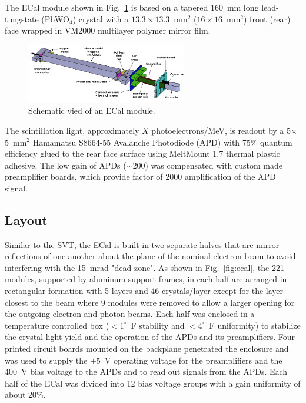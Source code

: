 \documentclass[final,3p,times,twocolumn]{elsarticle}
\begin{document}
The ECal module shown in Fig.~\ref{fig:ecal-module} is based on a tapered 160~mm long 
lead-tungstate (PbWO$_{4}$) crystal with a $13.3\times13.3$~mm$^2$ ($16\times16$~mm$^2$) front 
(rear) face wrapped in VM2000 multilayer polymer mirror film. 
\begin{figure}[]
\begin{center}
{\small
\includegraphics[width=7cm]{figures/ecal-module-schematic.png}
\caption{Schematic vied of an ECal module.}
\label{fig:ecal-module}
}
\end{center}
\end{figure}
The scintillation light, approximately $X$ photoelectrons/MeV, is readout by a 
5$\times$5~mm$^2$ Hamamatsu S8664-55 Avalanche Photodiode (APD) with 75\% quantum 
efficiency glued to the rear face surface using MeltMount 1.7 thermal plastic adhesive. 
The low gain of APDs ($\sim 200$) was compensated with custom made preamplifier boards, which 
provide factor of 2000 amplification of the APD signal.

\subsection{Layout}
Similar to the SVT, the ECal is built in two separate halves that are mirror reflections of one another 
about the plane of the nominal electron beam to avoid interfering with the 15~mrad "dead zone". 
As shown in Fig.~\ref{fig:ecal}, the 221 modules, supported by aluminum support frames, in each half 
are arranged in rectangular formation with 5 layers and 46 crystals/layer except for the layer closest to 
the beam where 9 modules were removed to allow a larger opening for the outgoing electron and 
photon beams. Each half was enclosed in a temperature controlled box ($<1^{\circ}$~F stability and 
$<4^{\circ}$~F uniformity) to stabilize the crystal light yield and the operation of the APDs and its 
preamplifiers. Four printed circuit boards mounted on the backplane penetrated the enclosure and was 
used to supply the $\pm 5$~V 
operating voltage for the preamplifiers and the 400~V bias voltage to the APDs and to read out signals 
from the APDs. Each half of the ECal was divided into 12 bias voltage groups with a gain uniformity 
of about 20\%. 
\end{document}
